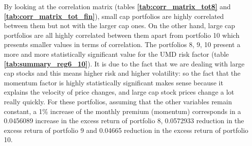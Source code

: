 \documentclass[11pt]{article}
\begin{document}
By looking at the correlation matrix (tables \textbf{\ref{tab:corr_matrix_tot8}} and \textbf{\ref{tab:corr_matrix_tot_fin}}), small cap portfolios are highly correlated 
between them but not with the larger cap ones. 
On the other hand, large cap portfolios 
are all highly correlated between them apart from portfolio 10 which presents smaller values in terms of correlation.\newline
The portfolios 8, 9, 10 present a more and more statistically significant value for the UMD risk factor (table \textbf{\ref{tab:summary_reg6_10}}). It is due to the fact 
that we are dealing with large cap stocks 
and this means higher risk and higher volatility: so the fact that the momentum factor is highly statistically significant makes sense because it explains the velocity of 
price changes, and large cap stock prices change a lot really quickly. For these portfolios, assuming that the other variables remain constant, a 1\% increase of the monthly 
premium (momentum) corresponds in a 0.0456089 increase in the excess return of portfolio 8, 0.0572933 reduction in the excess return of portfolio 9 and 0.04665 reduction in
the excess return of portfolio 10. 
\clearpage
\end{document}

